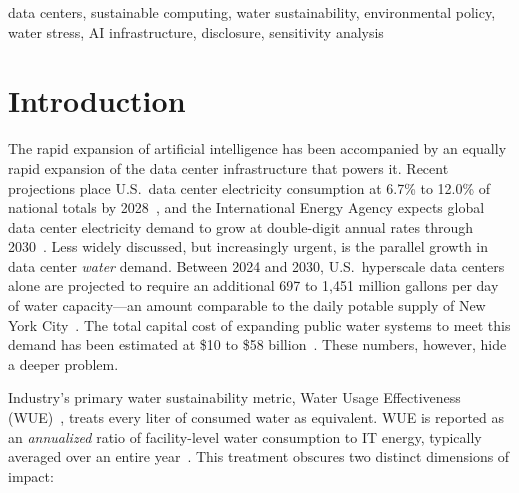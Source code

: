 \documentclass[conference,10pt]{IEEEtran}
\begin{document}
\begin{IEEEkeywords}
data centers, sustainable computing, water sustainability,
environmental policy, water stress, AI infrastructure, disclosure,
sensitivity analysis
\end{IEEEkeywords}

\section{Introduction}
\label{sec:introduction}

The rapid expansion of artificial intelligence has been accompanied by an
equally rapid expansion of the data center infrastructure that powers it.
Recent projections place U.S.\ data center electricity consumption at
6.7\% to 12.0\% of national totals by 2028~\cite{lbnl2024}, and the
International Energy Agency expects global data center electricity demand
to grow at double-digit annual rates through 2030~\cite{iea2025}. Less
widely discussed, but increasingly urgent, is the parallel growth in data
center \emph{water} demand. Between 2024 and 2030, U.S.\ hyperscale data
centers alone are projected to require an additional 697 to 1{,}451 million
gallons per day of water capacity---an amount comparable to the daily
potable supply of New York City~\cite{han2026}. The total capital cost of
expanding public water systems to meet this demand has been estimated at
\$10 to \$58 billion~\cite{han2026}. These numbers, however, hide a deeper
problem.

Industry's primary water sustainability metric, Water Usage Effectiveness
(WUE)~\cite{li2023thirsty}, treats every liter of consumed water as
equivalent. WUE is reported as an \emph{annualized} ratio of facility-level
water consumption to IT energy, typically averaged over an entire
year~\cite{google2024envreport, microsoft2024sustain, meta2025sustain}.
This treatment obscures two distinct dimensions of impact:
\end{document}
